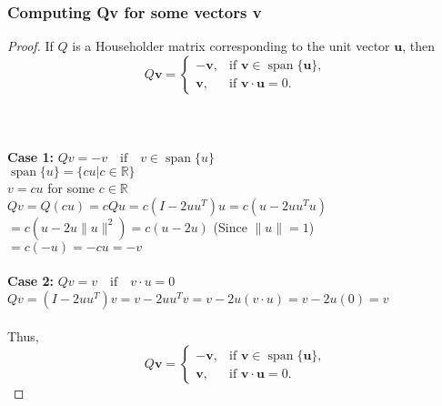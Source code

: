 \documentclass[12pt]{article}
\begin{document}
\subsubsection{Computing Qv for some vectors v}
\begin{proof} If \( Q \) is a Householder matrix corresponding to the unit vector \( \mathbf{u} \), then
\[
Q\mathbf{v} =
\begin{cases} 
-\mathbf{v}, & \text{if } \mathbf{v} \in \operatorname{span}\{\mathbf{u}\}, \\
\mathbf{v}, & \text{if } \mathbf{v} \cdot \mathbf{u} = 0.
\end{cases}
\] \\ \\ \\
\textbf{Case 1:} $Qv = -v \quad \text{if} \quad v \in \operatorname{span}\{u\}$ \\
    \indent \indent \indent $\operatorname{span}\{u\} = \{cu | c \in \mathbb{R}\}$ \\
    \indent \indent \indent $v = cu$ for some $c \in \mathbb{R}$ \\
    \indent \indent \indent $Qv = Q(cu) = cQu = c(I-2uu^T)u = c(u-2uu^Tu)$\\
    \indent \indent \indent $ = c(u-2u \|u\|^2) = c(u-2u)$ (Since $\|u\| = 1$) \\
    \indent \indent \indent $ = c(-u) = -cu = -v$ \\ \\
\textbf{Case 2:} $Qv = v \quad \text{if} \quad v \cdot u = 0$ \\
    \indent \indent \indent $Qv = (I-2uu^T)v = v - 2uu^Tv = v - 2u(v \cdot u) = v - 2u(0) = v$ \\ \\
Thus, 
\[
Q\mathbf{v} =
\begin{cases} 
-\mathbf{v}, & \text{if } \mathbf{v} \in \operatorname{span}\{\mathbf{u}\}, \\
\mathbf{v}, & \text{if } \mathbf{v} \cdot \mathbf{u} = 0.
\end{cases}
\]
\end{proof}
\end{document}
